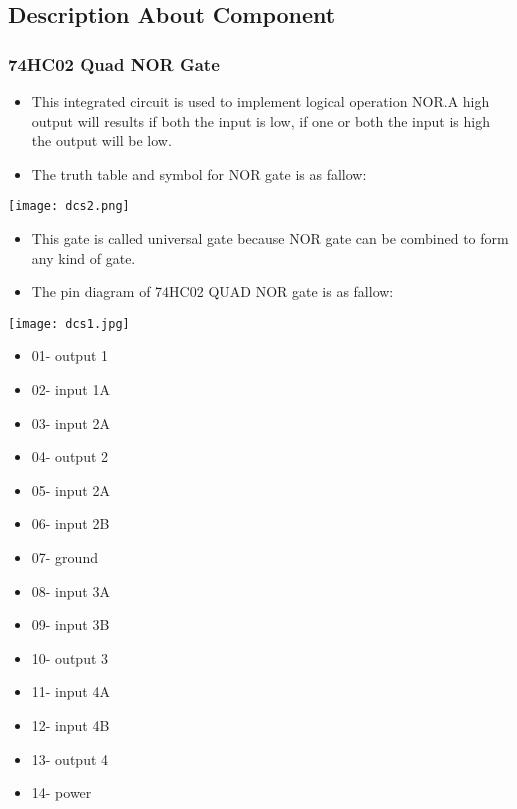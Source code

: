 \documentclass{article}
\begin{document}
\subsection{Description About Component}
\subsubsection {74HC02 Quad NOR Gate}
\begin{itemize}
\item This integrated circuit is used to implement logical operation NOR.A high output will results if both the input is low, if one or both the input is high the output will be low.
\item The truth table and symbol for NOR gate is as fallow:
\end {itemize}
\center
\texttt{[image: dcs2.png]}
\begin{itemize}
\item This gate is called universal gate because NOR gate can be combined to form any kind of gate.
\item The pin diagram of 74HC02 QUAD NOR gate is as fallow:
\end{itemize}
\center
\texttt{[image: dcs1.jpg]}
\center
\begin{itemize}
\item 01- output 1
\item 02- input 1A
\item 03- input 2A
\item 04- output 2
\item 05- input 2A
\item 06- input 2B
\item 07- ground
\item 08- input 3A
\item 09- input 3B
\item 10- output 3
\item 11- input 4A
\item 12- input 4B
\item 13- output 4
\item 14- power
\end{itemize}
\end{document}
